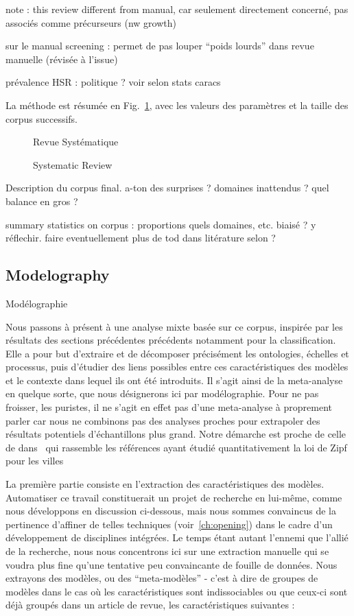 note : this review different from manual, car seulement directement concerné, pas associés comme précurseurs (nw growth)

sur le manual screening : permet de pas louper ``poids lourds'' dans revue manuelle (révisée à l'issue)

prévalence HSR : politique ? voir selon stats caracs

La méthode est résumée en Fig.~\ref{fig:modelography:systematicreview}, avec les valeurs des paramètres et la taille des corpus successifs. 


\begin{figure}
%
\caption{Systematic Review}{Revue Systématique}
\label{fig:modelography:systematicreview}
\end{figure}


Description du corpus final. a-ton des surprises ? domaines inattendus ? quel balance en gros ?

summary statistics on corpus : proportions quels domaines, etc. biaisé ? y réflechir. faire eventuellement plus de tod dans litérature selon ?




\subsection{Modelography}{Modélographie}


Nous passons à présent à une analyse mixte basée sur ce corpus, inspirée par les résultats des sections précédentes précédents notamment pour la classification. Elle a pour but d'extraire et de décomposer précisément les ontologies, échelles et processus, puis d'étudier des liens possibles entre ces caractéristiques des modèles et le contexte dans lequel ils ont été introduits. Il s'agit ainsi de la meta-analyse en quelque sorte, que nous désignerons ici par modélographie. Pour ne pas froisser, les puristes, il ne s'agit en effet pas d'une meta-analyse à proprement parler car nous ne combinons pas des analyses proches pour extrapoler des résultats potentiels d'échantillons plus grand. Notre démarche est proche de celle de  dans~\cite{2016arXiv160606162C} qui rassemble les références ayant étudié quantitativement la loi de Zipf pour les villes


La première partie consiste en l'extraction des caractéristiques des modèles. Automatiser ce travail constituerait un projet de recherche en lui-même, comme nous développons en discussion ci-dessous, mais nous sommes convaincus de la pertinence d'affiner de telles techniques (voir~\ref{ch:opening}) dans le cadre d'un développement de disciplines intégrées. Le temps étant autant l'ennemi que l'allié de la recherche, nous nous concentrons ici sur une extraction manuelle qui se voudra plus fine qu'une tentative peu convaincante de fouille de données. Nous extrayons des modèles, ou des ``meta-modèles'' - c'est à dire de groupes de modèles dans le cas où les caractéristiques sont indissociables ou que ceux-ci sont déjà groupés dans un article de revue, les caractéristiques suivantes :

